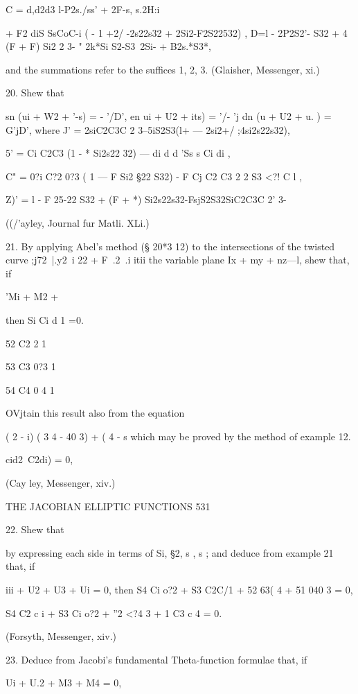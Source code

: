 C = d,d2d3 l-P2s./ss' + 2F-s, s.2H:i

+ F2 diS SsCoC-i ( - 1 +2/ -2s22s32 + 2Si2-F2S22532) , D=l - 2P2S2'-
S32 + 4 (F + F) Si2 2 3- " 2k*Si S2-S3~2Si- + B2s.*S3*,

and the summations refer to the suffices 1, 2, 3. (Glaisher,
Messenger, xi.)

20. Shew that

sn (ui + W2 + '-s) = - '/D', en ui + U2 + its) = '/- 'j dn (u + U2 +
u. ) = G'jD', where J' = 2siC2C3C 2 3--5iS2S3(l+ — 2si2+/
;4si2s22s32),

5' = Ci C2C3 (1 - * Si2s22 32) — di d d 'Ss s Ci di ,

C" = 0?i C?2 0?3 ( 1 — F Si2 §22 S32) - F Cj C2 C3 2 2 S3 <?! C l ,

Z)' = l - F 25-22 S32 + (F + *) Si2s22s32-FsjS2S32SiC2C3C 2' 3-

((/'ayley, Journal fur Matli. XLi.)

21. By applying Abel's method (§ 20*3 12) to the intersections of the
twisted curve ;j72\ |.y2\ i 22 + F\ .2\ .i itii the variable plane Ix
+ my + nz—l, shew that, if

'Mi + M2 + %

then Si Ci d 1 =0.

52 C2 2 1

53 C3 0?3 1

54 C4 0 4 1

OVjtain this result also from the equation

( 2 - i) ( 3 4 - 40 3) + ( 4 - s which may be proved by the method of
example 12.



 cid2~C2di) = 0,

(Cay ley, Messenger, xiv.)



THE JACOBIAN ELLIPTIC FUNCTIONS 531

22. Shew that

by expressing each side in terms of Si, §2, s , s ; and deduce from
example 21 that, if

iii + U2 + U3 + Ui = 0, then S4 Ci o?2 + S3 C2C/1 + 52 63( 4 + 51 040
3 = 0,

S4 C2 c i + S3 Ci o?2 + ''2 <?4 3 + 1 C3 c 4 = 0.

(Forsyth, Messenger, xiv.)

23. Deduce from Jacobi's fundamental Theta-function formulae that, if

Ui + U.2 + M3 + M4 = 0,

